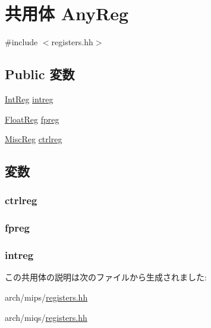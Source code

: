 \hypertarget{unionMipsISA_1_1AnyReg}{
\section{共用体 AnyReg}
\label{unionMipsISA_1_1AnyReg}
}


{\ttfamily \#include $<$registers.hh$>$}\subsection*{Public 変数}
\begin{DoxyCompactItemize}
\item 
\hyperlink{namespaceMipsISA_adf027691dfdcdef6002693b1e033700d}{IntReg} \hyperlink{unionMipsISA_1_1AnyReg_a95ddd97e75712a86f53c43636e713a94}{intreg}
\item 
\hyperlink{namespaceMipsISA_a449d6bb660f5ca613cf359f05d81a20f}{FloatReg} \hyperlink{unionMipsISA_1_1AnyReg_a9154b30def3ee5315e8660e1a491c681}{fpreg}
\item 
\hyperlink{namespaceMipsISA_aa16539aa6584fd12f7d6fa868f75b4de}{MiscReg} \hyperlink{unionMipsISA_1_1AnyReg_ae69c08de24012a3af86f0f33249f321d}{ctrlreg}
\end{DoxyCompactItemize}


\subsection{変数}
\hypertarget{unionMipsISA_1_1AnyReg_ae69c08de24012a3af86f0f33249f321d}{
\subsubsection[{ctrlreg}]{ {\bf ctrlreg}}}
\label{unionMipsISA_1_1AnyReg_ae69c08de24012a3af86f0f33249f321d}
\hypertarget{unionMipsISA_1_1AnyReg_a9154b30def3ee5315e8660e1a491c681}{
\subsubsection[{fpreg}]{ {\bf fpreg}}}
\label{unionMipsISA_1_1AnyReg_a9154b30def3ee5315e8660e1a491c681}
\hypertarget{unionMipsISA_1_1AnyReg_a95ddd97e75712a86f53c43636e713a94}{
\subsubsection[{intreg}]{ {\bf intreg}}}
\label{unionMipsISA_1_1AnyReg_a95ddd97e75712a86f53c43636e713a94}


この共用体の説明は次のファイルから生成されました:\begin{DoxyCompactItemize}
\item 
arch/mips/\hyperlink{mips_2registers_8hh}{registers.hh}\item 
arch/miqs/\hyperlink{miqs_2registers_8hh}{registers.hh}\end{DoxyCompactItemize}
